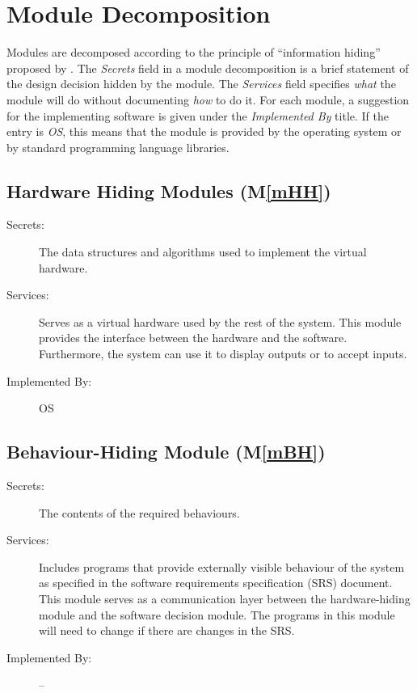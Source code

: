\documentclass[12pt, titlepage]{article}
\newcommand{\mref}[1]{M\ref{#1}}
\begin{document}
\section{Module Decomposition} \label{SecMD}

Modules are decomposed according to the principle of ``information hiding''
proposed by \citet{ParnasEtAl1984}. The \emph{Secrets} field in a module
decomposition is a brief statement of the design decision hidden by the
module. The \emph{Services} field specifies \emph{what} the module will do
without documenting \emph{how} to do it. For each module, a suggestion for the
implementing software is given under the \emph{Implemented By} title. If the
entry is \emph{OS}, this means that the module is provided by the operating
system or by standard programming language libraries.

\subsection{Hardware Hiding Modules (\mref{mHH})}

\begin{description}
\item[Secrets:]The data structures and algorithms used to implement the virtual
  hardware.
\item[Services:]Serves as a virtual hardware used by the rest of the
  system. This module provides the interface between the hardware and the
  software. Furthermore, the system can use it to display outputs or to accept inputs.
\item[Implemented By:] OS
\end{description}

\subsection{Behaviour-Hiding Module (\mref{mBH})}

\begin{description}
\item[Secrets:]The contents of the required behaviours.
\item[Services:]Includes programs that provide externally visible behaviour of
  the system as specified in the software requirements specification (SRS)
  document. This module serves as a communication layer between the
  hardware-hiding module and the software decision module. The programs in this
  module will need to change if there are changes in the SRS.
\item[Implemented By:] --
\end{description}
\end{document}
